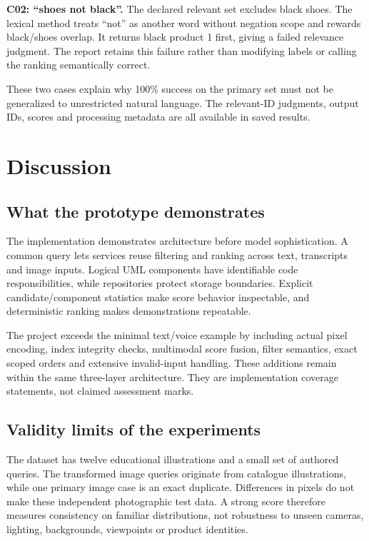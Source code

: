 \documentclass[11pt,a4paper]{article}
\begin{document}
\textbf{C02: ``shoes not black''.} The declared relevant set excludes black shoes. The lexical method treats ``not'' as another word without negation scope and rewards black/shoes overlap. It returns black product 1 first, giving a failed relevance judgment. The report retains this failure rather than modifying labels or calling the ranking semantically correct.

These two cases explain why 100\% success on the primary set must not be generalized to unrestricted natural language. The relevant-ID judgments, output IDs, scores and processing metadata are all available in saved results.

\section{Discussion}\label{sec:discussion}
\subsection{What the prototype demonstrates}
The implementation demonstrates architecture before model sophistication. A common query lets services reuse filtering and ranking across text, transcripts and image inputs. Logical UML components have identifiable code responsibilities, while repositories protect storage boundaries. Explicit candidate/component statistics make score behavior inspectable, and deterministic ranking makes demonstrations repeatable.

The project exceeds the minimal text/voice example by including actual pixel encoding, index integrity checks, multimodal score fusion, filter semantics, exact scoped orders and extensive invalid-input handling. These additions remain within the same three-layer architecture. They are implementation coverage statements, not claimed assessment marks.

\subsection{Validity limits of the experiments}
The dataset has twelve educational illustrations and a small set of authored queries. The transformed image queries originate from catalogue illustrations, while one primary image case is an exact duplicate. Differences in pixels do not make these independent photographic test data. A strong score therefore measures consistency on familiar distributions, not robustness to unseen cameras, lighting, backgrounds, viewpoints or product identities.
\end{document}

